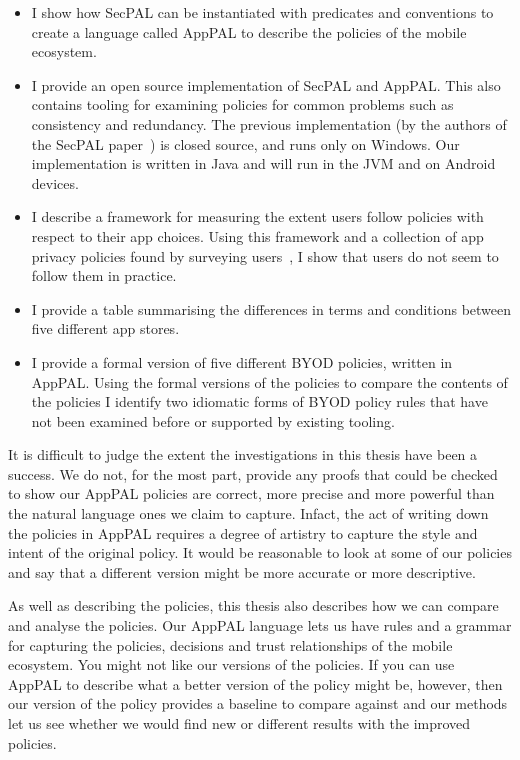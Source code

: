 \documentclass[thesis.tex]{subfiles}
\begin{document}
\begin{itemize}
  \item I show how SecPAL can be instantiated with predicates and conventions
    to create a language called AppPAL to describe the policies of the mobile
    ecosystem.
  \item I provide an open source implementation of SecPAL and AppPAL. This also
    contains tooling for examining policies for common problems such as
    consistency and redundancy.  The previous implementation (by the authors of
    the SecPAL paper~\cite{becker_secpal:_2006}) is closed source, and runs
    only on Windows.  Our implementation is written in Java and will run in the
    JVM and on Android devices.
  \item I describe a framework for measuring the extent users follow policies
    with respect to their app choices.  Using this framework and a collection
    of app privacy policies found by surveying users~\cite{lin_modelling_2014},
    I show that users do not seem to follow them in practice.
  \item I provide a table summarising the differences in terms and conditions
    between five different app stores.
  \item I provide a formal version of five different BYOD policies, written in
    AppPAL.  Using the formal versions of the policies to compare the contents
    of the policies I identify two idiomatic forms of BYOD policy rules that
    have not been examined before or supported by existing tooling.
\end{itemize}

It is difficult to judge the extent the investigations in this thesis have been
a success.  We do not, for the most part, provide any proofs that could be
checked to show our AppPAL policies are correct, more precise and more powerful
than the natural language ones we claim to capture.  Infact, the act of writing
down the policies in AppPAL requires a degree of artistry to capture the style
and intent of the original policy. It would be reasonable to look at some of
our policies and say that a different version might be more accurate or more
descriptive.

As well as describing the policies, this thesis also describes how we can
compare and analyse the policies. Our AppPAL language lets us have rules and a
grammar for capturing the policies, decisions and trust relationships of the
mobile ecosystem.  You might not like our versions of the policies. If you can
use AppPAL to describe what a better version of the policy might be, however,
then our version of the policy provides a baseline to compare against and our
methods let us see whether we would find new or different results with the
improved policies.
\end{document}
